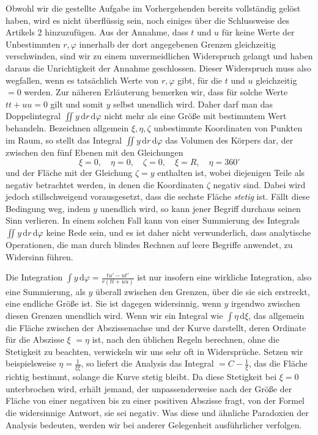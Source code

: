 Obwohl wir die gestellte Aufgabe im Vorhergehenden bereits vollständig gelöst haben, wird es nicht überflüssig sein, noch einiges über die Schlussweise des Artikels 2 hinzuzufügen. Aus der Annahme, dass $t$ und $u$ für keine Werte der Unbestimmten $r,\varphi$ innerhalb der dort angegebenen Grenzen gleichzeitig verschwinden, sind wir zu einem unvermeidlichen Widerspruch gelangt und haben daraus die Unrichtigkeit der Annahme geschlossen. Dieser Widerspruch muss also wegfallen, wenn es tatsächlich Werte von $r,\varphi$ gibt, für die $t$ und $u$ gleichzeitig $=0$ werden. Zur näheren Erläuterung bemerken wir, dass für solche Werte $tt+uu=0$ gilt und somit $y$ selbst unendlich wird. Daher darf man das Doppelintegral $\iint y\,\mathrm dr\,\mathrm d\varphi$ nicht mehr als eine Größe mit bestimmtem Wert behandeln. Bezeichnen allgemein $\xi,\eta,\zeta$ unbestimmte Koordinaten von Punkten im Raum, so stellt das Integral $\iint y\,\mathrm dr\,\mathrm d\varphi$ das Volumen des Körpers dar, der zwischen den fünf Ebenen mit den Gleichungen
\[
\xi=0,\quad\eta=0,\quad\zeta=0,\quad\xi=R,\quad\eta=360^\circ
\]
und der Fläche mit der Gleichung $\zeta=y$ enthalten ist, wobei diejenigen Teile als negativ betrachtet werden, in denen die Koordinaten $\zeta$ negativ sind. Dabei wird jedoch stillschweigend vorausgesetzt, dass die sechste Fläche \textit{stetig} ist. Fällt diese Bedingung weg, indem $y$ unendlich wird, so kann jener Begriff durchaus seinen Sinn verlieren. In einem solchen Fall kann von einer Summierung des Integrals $\iint y\,\mathrm dr\,\mathrm d\varphi$ keine Rede sein, und es ist daher nicht verwunderlich, dass analytische Operationen, die man durch blindes Rechnen auf leere Begriffe anwendet, zu Widersinn führen.

Die Integration $\int y\,\mathrm d\varphi=\frac{tu'-ut'}{r(tt+uu)}$ ist nur insofern eine wirkliche Integration, also eine Summierung, als $y$ überall zwischen den Grenzen, über die sie sich erstreckt, eine endliche Größe ist. Sie ist dagegen widersinnig, wenn $y$ irgendwo zwischen diesen Grenzen unendlich wird. Wenn wir ein Integral wie $\int\eta\,\mathrm d\xi$, das allgemein die Fläche zwischen der Abszissenachse und der Kurve darstellt, deren Ordinate für die Abszisse $\xi$ $=\eta$ ist, nach den üblichen Regeln berechnen, ohne die Stetigkeit zu beachten, verwickeln wir uns sehr oft in Widersprüche. Setzen wir beispielsweise $\eta=\frac1{\xi\xi}$, so liefert die Analysis das Integral $=C-\frac1\xi$, das die Fläche richtig bestimmt, solange die Kurve stetig bleibt. Da diese Stetigkeit bei $\xi=0$ unterbrochen wird, erhält jemand, der unpassenderweise nach der Größe der Fläche von einer negativen bis zu einer positiven Abszisse fragt, von der Formel die widersinnige Antwort, sie sei negativ. Was diese und ähnliche Paradoxien der Analysis bedeuten, werden wir bei anderer Gelegenheit ausführlicher verfolgen.

